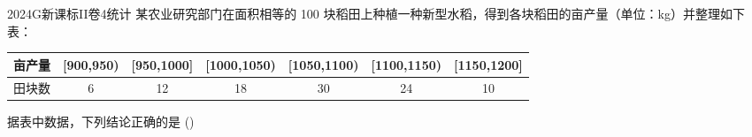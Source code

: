 
\begin{problem}{2024}{G}{新课标II卷}{4}{统计}
某农业研究部门在面积相等的 100 块稻田上种植一种新型水稻，得到各块稻田的亩产量（单位：kg）并整理如下表：
\begin{center}
\begin{tabular}{|l|c|c|c|c|c|c|}
\hline
亩产量 & [900,950) & [950,1000] & [1000,1050) & [1050,1100) & [1100,1150) & [1150,1200] \\
\hline
田块数 & 6 & 12 & 18 & 30 & 24 & 10 \\
\hline
\end{tabular}
\end{center}
据表中数据，下列结论正确的是
(\hspace{1cm})
\begin{choices}
\end{choices}
\end{problem}